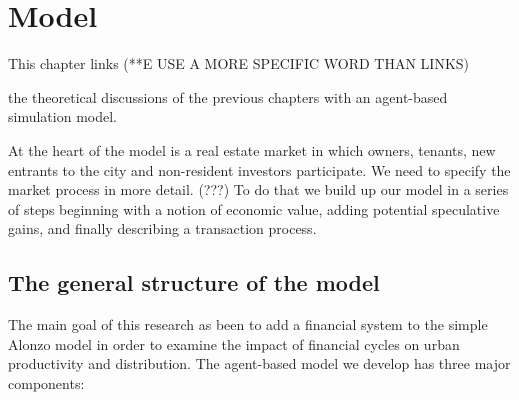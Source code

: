 \chapter{Model} \label{chapter-model}


This chapter links (**E USE A MORE SPECIFIC WORD THAN LINKS) %

the theoretical discussions of the previous chapters with an agent-based simulation model. 

At the heart of the model is a real estate market in which owners, tenants, new entrants to the city and non-resident investors participate. We need to specify the market process in more detail. (???) %
To do that we build up our model in a series of steps beginning with a notion of economic value, adding potential speculative gains, and finally describing a transaction process. 

\section{The general structure of the model}
The main goal of this research as been to add a financial system to the simple Alonzo model in order to examine the impact of financial cycles on urban productivity and distribution. The \gls{agent-based model} we develop has three major components: 

